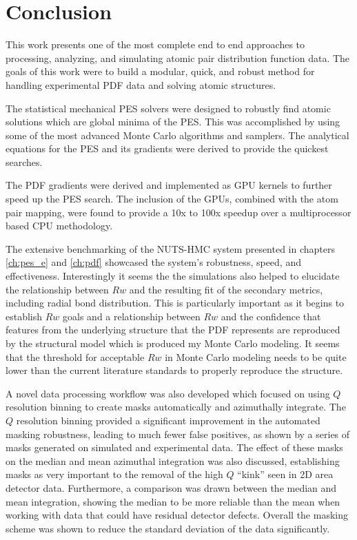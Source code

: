 \chapter{Conclusion}
This work presents one of the most complete end to end approaches to processing, analyzing, and simulating atomic pair distribution function data.
The goals of this work were to build a modular, quick, and robust method for handling experimental PDF data and solving atomic structures.

The statistical mechanical PES solvers were designed to robustly find atomic solutions which are global minima of the PES.
This was accomplished by using some of the most advanced Monte Carlo algorithms and samplers.
The analytical equations for the PES and its gradients were derived to provide the quickest searches.

The PDF gradients were derived and implemented as GPU kernels to further speed up the PES search.
The inclusion of the GPUs, combined with the atom pair mapping, were found to provide a 10x to 100x speedup over a multiprocessor based CPU methodology.

The extensive benchmarking of the NUTS-HMC system presented in chapters \ref{ch:pes_e} and \ref{ch:pdf} showcased the system's robustness, speed, and effectiveness.
Interestingly it seems the the simulations also helped to elucidate the relationship between $Rw$ and the resulting fit of the secondary metrics, including radial bond distribution.
This is particularly important as it begins to establish $Rw$ goals and a relationship between $Rw$ and the confidence that features from the underlying structure that the PDF represents are reproduced by the structural model which is produced my Monte Carlo modeling.
It seems that the threshold for acceptable $Rw$ in Monte Carlo modeling needs to be quite lower than the current literature standards to properly reproduce the structure.

A novel data processing workflow was also developed which focused on using $Q$ resolution binning to create masks automatically and azimuthally integrate.
The $Q$ resolution binning provided a significant improvement in the automated masking robustness, leading to much fewer false positives, as shown by a series of masks generated on simulated and experimental data.
The effect of these masks on the median and mean azimuthal integration was also discussed, establishing masks as very important to the removal of the high $Q$ ``kink'' seen in 2D area detector data.
Furthermore, a comparison was drawn between the median and mean integration, showing the median to be more reliable than the mean when working with data that could have residual detector defects.
Overall the masking scheme was shown to reduce the standard deviation of the data significantly.

